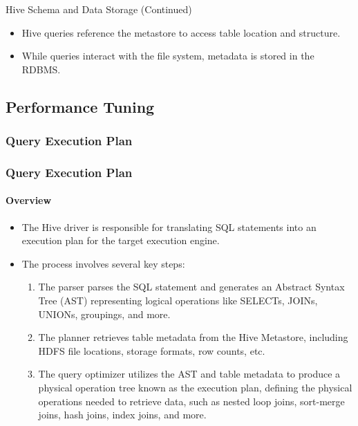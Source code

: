 \begin{frame}{Hive Schema and Data Storage (Continued)}
	\begin{itemize}
		\item Hive queries reference the metastore to access table location and structure.
		\item While queries interact with the file system, metadata is stored in the RDBMS.
	\end{itemize}
\end{frame}


\subsection{Performance Tuning}
\subsubsection{Query Execution Plan}
\begin{frame}
	\frametitle{Query Execution Plan}
	\framesubtitle{Overview}
	
	\begin{itemize}
	  \item The Hive driver is responsible for translating SQL statements into an execution plan for the target execution engine.
	  \item The process involves several key steps:
		\begin{enumerate}
		  \item The parser parses the SQL statement and generates an Abstract Syntax Tree (AST) representing logical operations like SELECTs, JOINs, UNIONs, groupings, and more.
		  \item The planner retrieves table metadata from the Hive Metastore, including HDFS file locations, storage formats, row counts, etc.
		  \item The query optimizer utilizes the AST and table metadata to produce a physical operation tree known as the execution plan, defining the physical operations needed to retrieve data, such as nested loop joins, sort-merge joins, hash joins, index joins, and more.
		\end{enumerate}

	\end{itemize}
	
	\end{frame}
	
